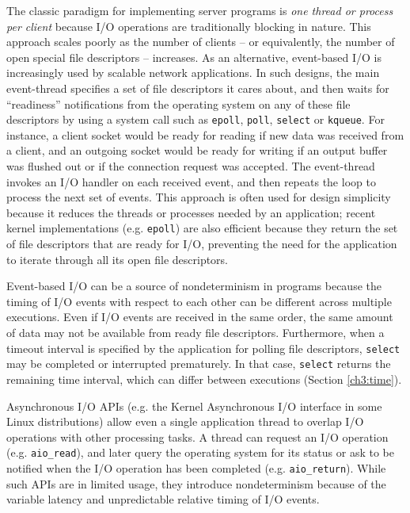 The classic paradigm for implementing server
programs is {\em one thread or process per client}
because I/O operations are traditionally blocking
in nature. This approach scales poorly as the number
of clients -- or equivalently, the number of open special file descriptors -- increases. 
As an alternative, event-based I/O is increasingly used 
by scalable network applications.
In such designs, the main event-thread
specifies a set of file descriptors it cares about,
and then waits for ``readiness'' notifications 
from the operating system on any of
these file descriptors by using a
system call such as \texttt{epoll}, \texttt{poll},
\texttt{select} or \texttt{kqueue}. 
For instance, a client socket would be ready 
for reading if new data was received from a client,
and an outgoing socket would be ready for 
writing if an output buffer was flushed out or if the 
connection request was accepted.
The event-thread invokes an I/O
handler on each received event, 
and then repeats the loop to process the next
set of events.
This approach is often used for design simplicity because it
reduces the threads or processes needed by an application; 
recent kernel implementations (e.g. \texttt{epoll}) are also
efficient because they return the set of file descriptors that are ready for I/O,
preventing the need for the application to iterate through all its open
file descriptors. 

Event-based I/O can be a source
of nondeterminism in programs because the
timing of I/O events with respect to each other
can be different across multiple executions.
Even if I/O events are received in the same order,
the same amount of data may not be available
from ready file descriptors. Furthermore, when a timeout
interval is specified by the application for polling file descriptors,
\texttt{select} may be completed or interrupted
prematurely. In that case, \texttt{select} returns
the remaining time interval, which can     
differ between executions (Section \ref{ch3:time}). \newline

 \newline
Asynchronous I/O APIs (e.g. the Kernel Asynchronous I/O interface
in some Linux distributions) allow even a single application
thread to overlap I/O operations with other processing
tasks. A thread can request an I/O operation (e.g. \texttt{aio\_read}),
and later query the operating system for its status or ask to be notified when the I/O operation
has been completed (e.g. \texttt{aio\_return}). While such APIs are in limited
usage, they introduce nondeterminism because of the
variable latency and unpredictable relative timing of I/O events.

